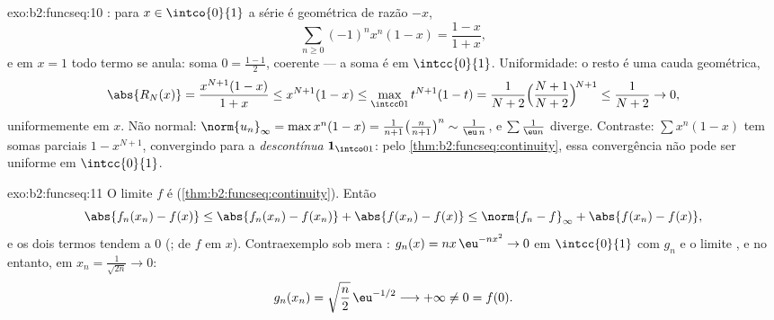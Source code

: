\begin{solution}{exo:b2:funcseq:10}
: para $x \in \intco{0}{1}$ a série é geométrica de
razão $-x$,
\[
\sum_{n\geq0}(-1)^n x^n(1-x) = \frac{1-x}{1+x},
\]
e em $x = 1$ todo termo se anula: soma $0 = \frac{1-1}{2}$,
coerente --- a soma é  em $\intcc{0}{1}$.
Uniformidade: o resto é uma cauda geométrica,
\[
\abs{R_N(x)} = \frac{x^{N+1}(1-x)}{1+x} \leq x^{N+1}(1 - x)
\leq \max_{\intcc01} t^{N+1}(1-t)
= \frac{1}{N+2}\Bigl(\frac{N+1}{N+2}\Bigr)^{\!N+1}
\leq \frac{1}{N+2} \to 0 ,
\]
uniformemente em $x$. Não normal: $\norm{u_n}_\infty =
\max x^n(1-x) = \frac{1}{n+1}\bigl(\frac{n}{n+1}\bigr)^n \sim
\frac{1}{\eu\,n}$, e $\sum \frac1{\eu n}$ diverge. Contraste:
$\sum x^n(1-x)$ tem somas parciais $1 - x^{N+1}$, convergindo
 para a \emph{descontínua} $\mathbf 1_{\intco01}$: pelo
\cref{thm:b2:funcseq:continuity}, essa convergência não pode ser
uniforme em $\intcc{0}{1}$.
\end{solution}

\begin{solution}{exo:b2:funcseq:11}
O limite $f$ é  (\cref{thm:b2:funcseq:continuity}).
Então
\[
\abs{f_n(x_n) - f(x)}
\leq \abs{f_n(x_n) - f(x_n)} + \abs{f(x_n) - f(x)}
\leq \norm{f_n - f}_\infty + \abs{f(x_n) - f(x)} ,
\]
e os dois termos tendem a $0$ (;  de
$f$ em $x$). Contraexemplo sob mera :
$g_n(x) = nx\,\eu^{-nx^2} \to 0$  em $\intcc{0}{1}$
com $g_n$ e o limite , e no entanto, em $x_n =
\frac{1}{\sqrt{2n}} \to 0$:
\[
g_n(x_n) = \sqrt{\frac n2}\,\eu^{-1/2} \longrightarrow +\infty
\neq 0 = f(0) .
\]
\end{solution}

